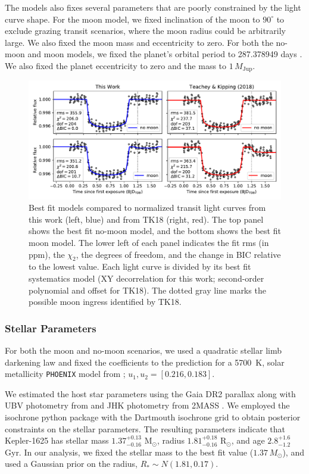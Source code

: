\documentclass[twocolumn]{aastex62}
\begin{document}
The models also fixes several parameters that are poorly constrained by the light curve shape. For the moon model, we fixed inclination of the moon to $90^\circ$ to exclude grazing transit scenarios, where the moon radius could be arbitrarily large.  We also fixed the moon mass and eccentricity to zero.  For both the no-moon and moon models, we fixed the planet's orbital period to 287.378949 days \citep{teachey18b}. We also fixed the planet eccentricity to zero and the mass to $1\,M_\mathrm{Jup}$. 

\begin{figure}
\includegraphics[width = 1.0 \textwidth]{figures/fig3_bestfits.pdf}
    \caption{Best fit models compared to normalized transit light curves from this work (left, blue) and from TK18 (right, red). The top panel shows the best fit no-moon model, and the bottom shows the best fit moon model. The lower left of each panel indicates the fit rms (in ppm), the $\chi_2$, the degrees of freedom, and the change in BIC relative to the lowest value.  Each light curve is divided by its best fit systematics model (XY decorrelation for this work; second-order polynomial and offset for TK18).  The dotted gray line marks the possible moon ingress identified by TK18.}
\label{fig:bestfit}
\end{figure}


\subsubsection{Stellar Parameters}
For both the moon and no-moon scenarios, we used a quadratic stellar limb darkening law and fixed the coefficients to the prediction for a 5700~K, solar metallicity \texttt{PHOENIX} model from \cite{espinoza15}; $u_1, u_2 = [0.216, 0.183]$.  

We estimated the host star parameters using the Gaia DR2 parallax \citep{Gaia, GaiaDR2} along with UBV photometry from \citet{Everett2012} and JHK photometry from 2MASS \citep{2MASS}. We employed the isochrone python package \citep{isochrone} with the Dartmouth isochrone grid \citep{Dotter2008} to obtain posterior constraints on the stellar parameters. The resulting parameters indicate that Kepler-1625 has stellar mass $1.37^{+0.13}_{-0.16}$ M$_{\odot}$, radius $1.81^{+0.18}_{-0.16}$ R$_{\odot}$, and age $2.8^{+1.6}_{-1.2}$ Gyr. In our analysis, we fixed the stellar mass to the best fit value ($1.37\,M_\odot$), and used a Gaussian prior on the radius, $R_* \sim N(1.81, 0.17)$.
\end{document}
